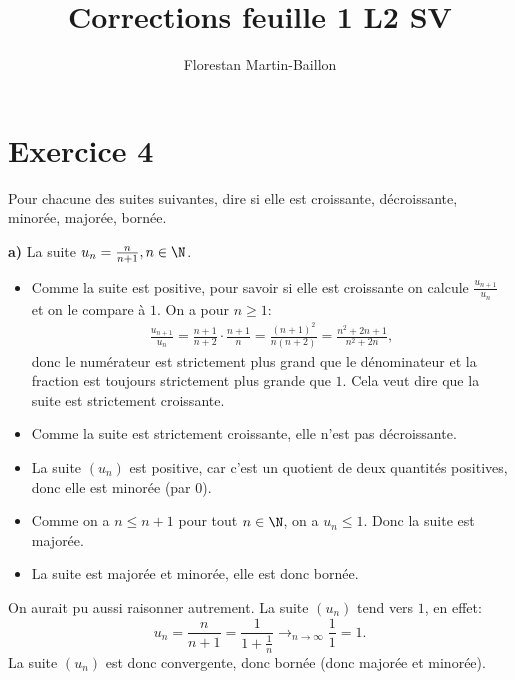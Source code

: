 \documentclass[12pt, a4paper,oneside]{article} %
\title{Corrections feuille 1 L2 SV}
\author{Florestan {Martin-Baillon}}
\begin{document}
\maketitle

\section{Exercice 4}

Pour chacune des suites suivantes, dire si elle
est croissante, décroissante, minorée, majorée,
bornée.

\textbf{a)}
La suite
$ u_{n} = \frac{n}{n+1}, n \in \N $.
\begin{itemize}
	\item
		Comme la suite est positive,
		pour savoir si elle est croissante
		on calcule $ \frac{u_{n+1} }{u_{n} } $
		et on le compare à $ 1 $.
		On a pour $ n \ge 1 $:
		\begin{align}
		\frac{u_{n+1} }{u_{n} }
		=
		\frac{n+1}{n+2}
		\cdot
		\frac{n+1}{n}
		=
		\frac{(n+1)^{2} }{n(n+2)}
		=
		\frac{n^2 + 2n + 1}{n^2 + 2n}
		,
		\end{align}
		donc le numérateur est strictement
		plus grand
		que le dénominateur
		et la fraction est toujours
		strictement plus grande
		que $ 1 $.
		Cela veut dire que la suite
		est strictement croissante.
	\item Comme la suite est strictement croissante,
		elle n'est pas décroissante.
	\item La suite $ (u_{n}) $ est positive,
		car c'est un quotient de deux
		quantités positives,
		donc elle est minorée
		(par $ 0 $).
	\item Comme on a $ n \le n+1 $
		pour tout $ n \in \N $,
		on a $ u_{n} \le 1 $.
		Donc la suite est majorée.
	\item La suite est majorée et minorée,
		elle est donc bornée.
\end{itemize}
On aurait pu aussi raisonner autrement.
La suite $ (u_{n}) $ tend vers $ 1 $,
en effet:
\begin{equation}
	u_{n}
	=
	\frac{n}{n+1}
	=
	\frac{1}{1 + \frac{1}{n}}
	\to_{n \to \infty} 
	\frac{1}{1}
	= 1.
\end{equation}
La suite $ (u_{n}) $
est donc convergente,
donc bornée
(donc majorée et minorée).
\end{document}
